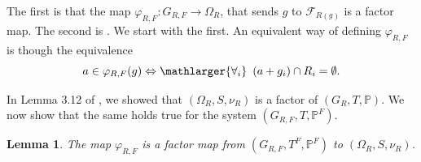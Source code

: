 \documentclass[a4paper,11pt,reqno]{amsart}
\theoremstyle{plain}
\newtheorem{lemma}[theorem]{Lemma}
\theoremstyle{remark}
\newcommand{\cf}{\mathcal{F}}
\newcommand{\grf}{G_{R,F}}
\newcommand{\vrf}{\varphi_{R,F}}
\newcommand{\mmp}{\mathbb{P}}
\begin{document}
			The first is that the map $\vrf: \grf \rightarrow \Omega_{R}$, that sends $g$ to $\cf_{R(g)}$ is a factor map. The second is . We start with the first. An equivalent way of defining $\vrf$ is though the equivalence $$a \in \vrf(g) \Leftrightarrow \mathlarger{\forall_{i}} \hspace{5pt} (a+g_i) \cap R_i = \emptyset. $$
			
			In Lemma 3.12 of \cite{part1}, we showed that $(\Omega_{R}, S, \nu_R)$ is a factor of $(G_R,T,\mmp)$. We now show that the same holds true for the system $(\grf, T, \mmp^F)$. 
			
			\begin{lemma}
				\label{lm: vrf factor map}
				The map $\vrf$ is a factor map from $(\grf, T^F, \mmp^F)$ to $(\Omega_{R}, S, \nu_R)$.
			\end{lemma}
			
\end{document}
